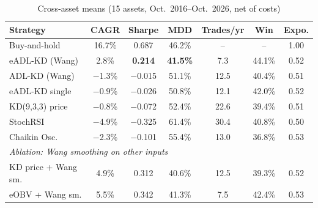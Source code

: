 \documentclass[conference]{IEEEtran}
\begin{document}
\begin{table}[t]
\caption{Cross-asset means (15 assets, Oct.\ 2016--Oct.\ 2026, net of costs)}
\label{tab:main}
\centering
\footnotesize\setlength{\tabcolsep}{2.5pt}
\begin{tabular}{lcccccc}
\toprule
Strategy & CAGR & Sharpe & MDD & Trades/yr & Win & Expo.\\
\midrule
Buy-and-hold          & 16.7\% & 0.687 & 46.2\% & --   & --    & 1.00\\
\midrule
eADL-KD (Wang)        & 2.8\%  & \textbf{0.214} & \textbf{41.5\%} & 7.3  & 44.1\% & 0.52\\
ADL-KD (Wang)         & $-$1.3\% & $-$0.015 & 51.1\% & 12.5 & 40.4\% & 0.51\\
eADL-KD single        & $-$0.9\% & $-$0.026 & 50.8\% & 12.1 & 42.0\% & 0.52\\
KD(9,3,3) price       & $-$0.8\% & $-$0.072 & 52.4\% & 22.6 & 39.4\% & 0.51\\
StochRSI              & $-$4.9\% & $-$0.325 & 61.4\% & 30.4 & 40.8\% & 0.50\\
Chaikin Osc.          & $-$2.3\% & $-$0.101 & 55.4\% & 13.0 & 36.8\% & 0.53\\
\midrule
\multicolumn{7}{l}{\emph{Ablation: Wang smoothing on other inputs}}\\
KD price + Wang sm.   & 4.9\%  & 0.312 & 40.6\% & 12.5 & 39.3\% & 0.52\\
eOBV + Wang sm.       & 5.5\%  & 0.342 & 41.3\% & 7.5  & 42.4\% & 0.53\\
\bottomrule
\end{tabular}
\end{table}
\end{document}
